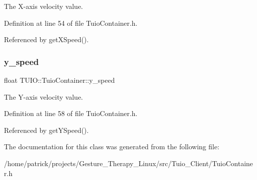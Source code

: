The X-\/axis velocity value. 

Definition at line 54 of file Tuio\+Container.\+h.



Referenced by get\+X\+Speed().

\mbox{\label{class_t_u_i_o_1_1_tuio_container_a2499ba8d5c0d8ca4afc3b55ddff4ff1a}} 
\subsubsection{\texorpdfstring{y\+\_\+speed}{y\_speed}}
{\footnotesize\ttfamily float T\+U\+I\+O\+::\+Tuio\+Container\+::y\+\_\+speed\hspace{0.3cm}{\ttfamily [protected]}}

The Y-\/axis velocity value. 

Definition at line 58 of file Tuio\+Container.\+h.



Referenced by get\+Y\+Speed().



The documentation for this class was generated from the following file\+:\begin{DoxyCompactItemize}
\item 
/home/patrick/projects/\+Gesture\+\_\+\+Therapy\+\_\+\+Linux/src/\+Tuio\+\_\+\+Client/Tuio\+Container.\+h\end{DoxyCompactItemize}
